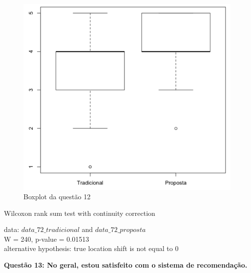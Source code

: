 \begin{figure}[htb]
  \caption{\label{fig:questao12-boxplot}Boxplot da questão 12}
  \begin{center}
      \includegraphics[scale=0.6]{./Figuras/questao12-boxplot.png}
  \end{center}
\end{figure}

Wilcoxon rank sum test with continuity correction

data:  $data\_72\_tradicional$ and $data\_72\_proposta$\\
W = 240, p-value = 0.01513\\
alternative hypothesis: true location shift is not equal to 0

\newpage
\textbf{Questão 13: No geral, estou satisfeito com o sistema de recomendação.}

